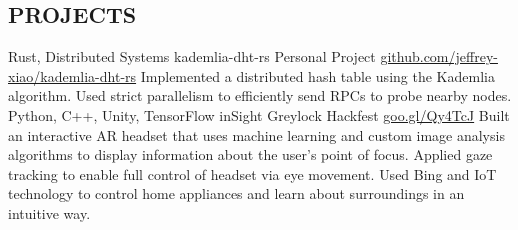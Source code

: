 \documentclass{resume}
\begin{document}
\begin{main}
    \section{PROJECTS}
      \begin{entrylist}
        \rightentry%
          {Rust, Distributed Systems}%
          {kademlia-dht-rs}%
          {Personal Project}%
          {\href{https://github.com/jeffrey-xiao/kademlia-dht-rs}{github.com/jeffrey-xiao/kademlia-dht-rs}}%
          {\createlist%
            {%
              Implemented a distributed hash table using the Kademlia algorithm. %
            }%
            {%
              Used strict parallelism to efficiently send RPCs to probe nearby nodes. %
            }%
          }
        \rightentry%
          {Python, C++, Unity, TensorFlow}%
          {inSight}%
          {Greylock Hackfest}%
          {\href{https://goo.gl/Qy4TcJ}{goo.gl/Qy4TcJ}}%
          {\createlist%
            {%
              Built an interactive AR headset that uses machine learning and custom image %
              analysis algorithms to display information about the user's point of focus. %
            }%
            {%
              Applied gaze tracking to enable full control of headset via eye movement. %
            }%
            {%
              Used Bing and IoT technology to control home appliances and learn about surroundings %
              in an intuitive way. %
            }%
          }
      \end{entrylist}
  \end{main}
\end{document}
